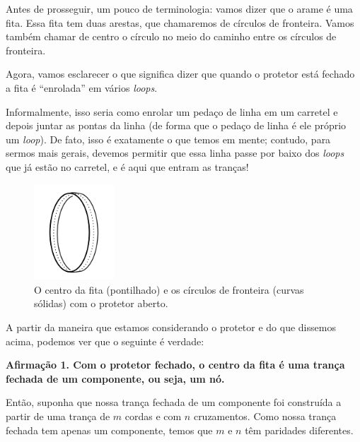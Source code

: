 	\par\vspace{0.3cm} Antes de prosseguir, um pouco de terminologia: vamos dizer que o arame é uma fita. 
	Essa fita tem duas arestas, que chamaremos de círculos de fronteira. Vamos também chamar de centro o 
	círculo no meio do caminho entre os círculos de fronteira. 
	
	\par\vspace{0.3cm} Agora, vamos esclarecer o que significa dizer que quando o protetor está fechado 
	a fita é ``enrolada'' em vários \textit{loops}.
	
	\par\vspace{0.3cm} Informalmente, isso seria como enrolar um pedaço de linha em um carretel e depois 
	juntar as pontas da linha (de forma que o pedaço de linha é ele próprio um \textit{loop}). De fato, 
	isso é exatamente o que temos em mente; contudo, para sermos mais gerais, devemos permitir que essa 
	linha passe por baixo dos \textit{loops} que já estão no carretel, e é aqui que entram as tranças! 
	\begin{figure}[H]
		\begin{center}
			\includegraphics[width=3cm]{Images/fita.png}
		\end{center}
		\caption{O centro da fita (pontilhado) e os círculos de fronteira (curvas sólidas) com o protetor aberto.}
	\end{figure}
	A partir da maneira que estamos considerando o protetor e do que dissemos acima, 
	podemos ver que o seguinte é verdade:
	\begin{center}
		\textbf{Afirmação 1. Com o protetor fechado, o centro da fita é uma trança fechada de um componente, 
		ou seja, um nó.}
	\end{center}
	Então, suponha que nossa trança fechada de um componente foi construída a partir 
	de uma trança de $m$ cordas e com $n$ cruzamentos. Como nossa trança fechada tem apenas um componente, 
	temos que $m$ e $n$ têm paridades diferentes.
	
